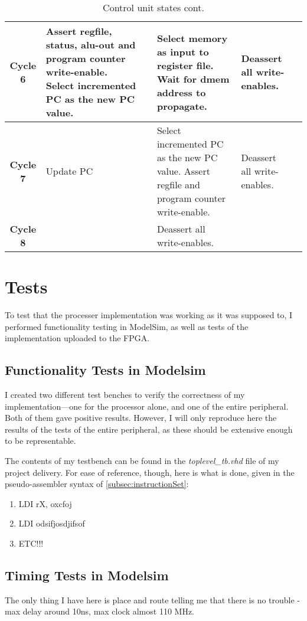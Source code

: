 \documentclass[11pt]{article}
\begin{document}
\begin{table}[htbp]
  \centering
  \begin{tabular}{|c|p{50pt}|p{50pt}|p{50pt}|p{50pt}|p{50pt}|}
    \hline
    {\bf Cycle 6} & Assert regfile, status, alu-out and program counter write-enable. Select incremented PC as the new PC value. &  & Select memory as input to register file. Wait for dmem address to propagate.  & Deassert all write-enables.  & \\ \hline
    {\bf Cycle 7} & Update PC &  & Select incremented PC as the new PC value. Assert regfile and program counter write-enable. & Deassert all write-enables. &  \\ \hline
    {\bf Cycle 8} &  &  & Deassert all write-enables. &  &  \\ \hline
  \end{tabular}
  \caption{Control unit states cont.}
  \label{tab:controlUnitStatesCont}
\end{table}

\section{Tests}
\label{sec:tests}
To test that the processer implementation was working as it was
supposed to, I performed functionality testing in ModelSim, as well as
tests of the implementation uploaded to the FPGA.
\subsection{Functionality Tests in Modelsim}
\label{subsec:functestsim}
I created two different test benches to verify the correctness of my
implementation---one for the processor alone, and one of the entire
peripheral. Both of them gave positive results. However, I will only
reproduce here the results of the tests of the entire peripheral, as
these should be extensive enough to be representable.

The contents of my testbench can be found in the {\em
  toplevel\_tb.vhd} file of my project delivery. For ease of
reference, though, here is what is done, given in the pseudo-assembler
syntax of \autoref{subsec:instructionSet}:
\begin{enumerate}
\item LDI rX, oxcfoj
\item LDI odsifjosdjifsof
\item ETC!!!
\end{enumerate}


\subsection{Timing Tests in Modelsim}
\label{subsec:timingtestsim}
The only thing I have here is place and route telling me that there is no trouble - max delay around 10ns, max clock almost 110 MHz.
\end{document}
